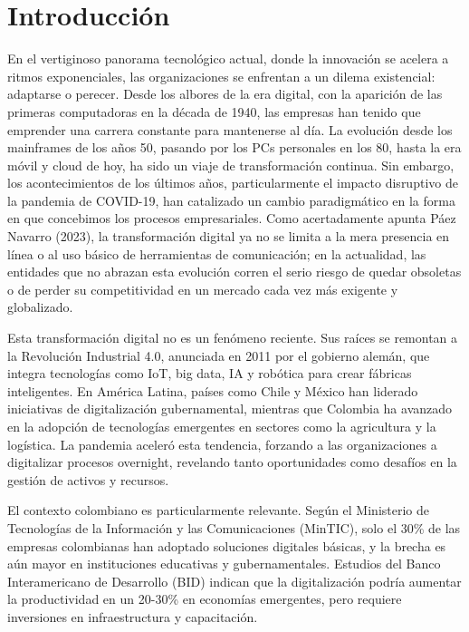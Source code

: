 \section{Introducción}

En el vertiginoso panorama tecnológico actual, donde la innovación se acelera a ritmos exponenciales, las organizaciones se enfrentan a un dilema existencial: adaptarse o perecer. Desde los albores de la era digital, con la aparición de las primeras computadoras en la década de 1940, las empresas han tenido que emprender una carrera constante para mantenerse al día. La evolución desde los mainframes de los años 50, pasando por los PCs personales en los 80, hasta la era móvil y cloud de hoy, ha sido un viaje de transformación continua. Sin embargo, los acontecimientos de los últimos años, particularmente el impacto disruptivo de la pandemia de COVID-19, han catalizado un cambio paradigmático en la forma en que concebimos los procesos empresariales. Como acertadamente apunta Páez Navarro (2023), la transformación digital ya no se limita a la mera presencia en línea o al uso básico de herramientas de comunicación; en la actualidad, las entidades que no abrazan esta evolución corren el serio riesgo de quedar obsoletas o de perder su competitividad en un mercado cada vez más exigente y globalizado.

Esta transformación digital no es un fenómeno reciente. Sus raíces se remontan a la Revolución Industrial 4.0, anunciada en 2011 por el gobierno alemán, que integra tecnologías como IoT, big data, IA y robótica para crear fábricas inteligentes. En América Latina, países como Chile y México han liderado iniciativas de digitalización gubernamental, mientras que Colombia ha avanzado en la adopción de tecnologías emergentes en sectores como la agricultura y la logística. La pandemia aceleró esta tendencia, forzando a las organizaciones a digitalizar procesos overnight, revelando tanto oportunidades como desafíos en la gestión de activos y recursos.

El contexto colombiano es particularmente relevante. Según el Ministerio de Tecnologías de la Información y las Comunicaciones (MinTIC), solo el 30\% de las empresas colombianas han adoptado soluciones digitales básicas, y la brecha es aún mayor en instituciones educativas y gubernamentales. Estudios del Banco Interamericano de Desarrollo (BID) indican que la digitalización podría aumentar la productividad en un 20-30\% en economías emergentes, pero requiere inversiones en infraestructura y capacitación.

